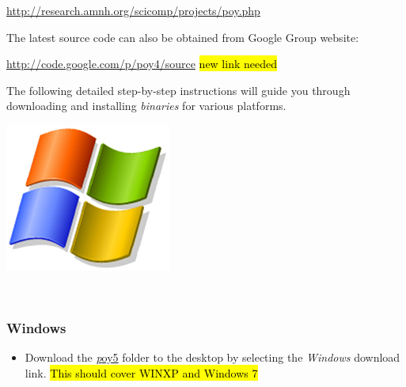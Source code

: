 \begin{center}
\url{http://research.amnh.org/scicomp/projects/poy.php}
\end{center}
The latest source code can also be obtained from \poy Google Group website:
\begin{center}
\url{http://code.google.com/p/poy4/source}
\hl{new link needed}
\end{center}
The following detailed step-by-step instructions will guide you through downloading and installing \poy \emph{binaries} for various platforms.

\begin{flushleft}
	\begin{minipage}[c]{0.074\textwidth}
	   	\includegraphics[width=\textwidth]{doc/figures/figlogowindows.jpg}
	\end{minipage}
	\,
	\begin{minipage}[t]{0.88\textwidth}
		   	\subsubsection*{Windows}
	\end{minipage}
		\begin{itemize}
			\item
                Download the
                \href{http://research.amnh.org/scicomp/projects/poy.php}{\emph poy5} folder to the desktop by selecting the \emph{Windows} download link. \hl{This should cover WINXP and Windows 7} 


\end{itemize}
\end{flushleft}

